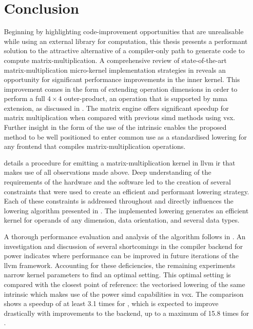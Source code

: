 \documentclass[\main/thesis.tex]{subfiles}
\begin{document}
\chapter{Conclusion}
\label{cha:conclusion}
Beginning by highlighting code-improvement opportunities that are unrealisable while using an external library for computation, this thesis presents a performant solution to the attractive alternative of a compiler-only path to generate code to compute matrix-multiplication.
A comprehensive review of state-of-the-art matrix-multiplication micro-kernel implementation strategies in  reveals an opportunity for significant performance improvements in the inner kernel.
This improvement comes in the form of extending operation dimensions in order to perform a full $4 \times 4$ outer-product, an operation that is supported by  \gls{mma} extension, as discussed in .
The \gls{matrix engine} offers significant speedup for matrix multiplication when compared with previous \gls{simd} methods using \gls{vsx}.
Further insight in the form of the use of the  intrinsic enables the proposed method to be well positioned to enter common use as a standardised \gls{lowering} for any frontend that compiles matrix-multiplication operations.

 details a procedure for emitting a matrix-multiplication kernel in \gls{llvm} \gls{ir} that makes use of all observations made above.
Deep understanding of the requirements of the hardware and the software led to the creation of several constraints that were used to create an efficient and performant \gls{lowering} strategy.
Each of these constraints is addressed throughout  and directly influences the \gls{lowering} algorithm presented in .
The implemented lowering generates an efficient kernel for operands of any dimension, data orientation, and several data types.

A thorough performance evaluation and analysis of the algorithm follows in .
An investigation and discussion of several shortcomings in the compiler backend for \gls{power} indicates where performance can be improved in future iterations of the \gls{llvm} framework.
Accounting for these deficiencies, the remaining experiments narrow kernel parameters to find an optimal setting.
This optimal setting is compared with the closest point of reference: the vectorised lowering of the same intrinsic which makes use of the \gls{power}  \gls{simd} capabilities in \gls{vsx}.
The comparison shows a speedup of at least 3.1 times for , which is expected to improve drastically with improvements to the backend, up to a maximum of 15.8 times for .
\end{document}
